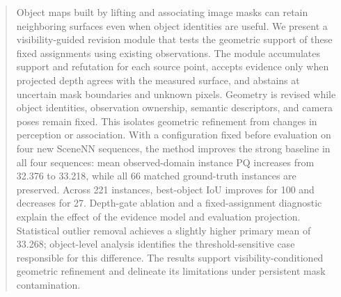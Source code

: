 \begin{abstract}
Object maps built by lifting and associating image masks can retain neighboring surfaces even when object identities are useful. We present a visibility-guided revision module that tests the geometric support of these fixed assignments using existing observations. The module accumulates support and refutation for each source point, accepts evidence only when projected depth agrees with the measured surface, and abstains at uncertain mask boundaries and unknown pixels. Geometry is revised while object identities, observation ownership, semantic descriptors, and camera poses remain fixed. This isolates geometric refinement from changes in perception or association. With a configuration fixed before evaluation on four new SceneNN sequences, the method improves the strong baseline in all four sequences: mean observed-domain instance PQ increases from 32.376 to 33.218, while all 66 matched ground-truth instances are preserved. Across 221 instances, best-object IoU improves for 100 and decreases for 27. Depth-gate ablation and a fixed-assignment diagnostic explain the effect of the evidence model and evaluation projection. Statistical outlier removal achieves a slightly higher primary mean of 33.268; object-level analysis identifies the threshold-sensitive case responsible for this difference. The results support visibility-conditioned geometric refinement and delineate its limitations under persistent mask contamination.
\end{abstract}
